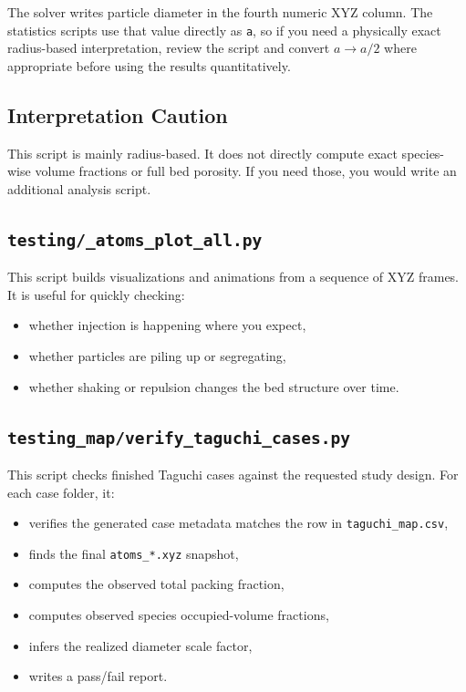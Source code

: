 \documentclass[11pt]{article}
\begin{document}
The solver writes particle diameter in the fourth numeric XYZ column. The statistics scripts use that value directly as \texttt{a}, so if you need a physically exact radius-based interpretation, review the script and convert \(a \rightarrow a/2\) where appropriate before using the results quantitatively.

\subsection{Interpretation Caution}

This script is mainly radius-based. It does not directly compute exact species-wise volume fractions or full bed porosity. If you need those, you would write an additional analysis script.

\subsection{\texttt{testing/\_atoms\_plot\_all.py}}

This script builds visualizations and animations from a sequence of XYZ frames. It is useful for quickly checking:
\begin{itemize}
  \item whether injection is happening where you expect,
  \item whether particles are piling up or segregating,
  \item whether shaking or repulsion changes the bed structure over time.
\end{itemize}

\subsection{\texttt{testing\_map/verify\_taguchi\_cases.py}}

This script checks finished Taguchi cases against the requested study design. For each case folder, it:
\begin{itemize}
  \item verifies the generated case metadata matches the row in \texttt{taguchi\_map.csv},
  \item finds the final \texttt{atoms\_*.xyz} snapshot,
  \item computes the observed total packing fraction,
  \item computes observed species occupied-volume fractions,
  \item infers the realized diameter scale factor,
  \item writes a pass/fail report.
\end{itemize}
\end{document}
